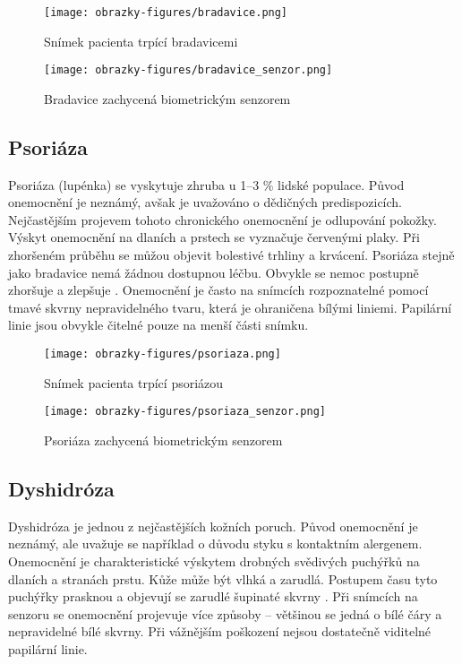 \begin{figure}[!htbp]
  \begin{minipage}[b]{0.5\linewidth}
    \centering
    \texttt{[image: obrazky-figures/bradavice.png]}
    \caption{Snímek pacienta trpící bradavicemi \cite{InfluenceSkinDiseases}}
  \end{minipage}
  \hspace{0.5cm}
  \begin{minipage}[b]{0.5\linewidth}
    \centering
    \texttt{[image: obrazky-figures/bradavice\_senzor.png]}
    \caption{Bradavice zachycená biometrickým senzorem \cite{Barotova}}
  \end{minipage}
\end{figure}

\subsection{Psoriáza}
Psoriáza (lupénka) se vyskytuje zhruba u 1--3 \% lidské populace. Původ onemocnění je neznámý, avšak je uvažováno o dědičných predispozicích. Nejčastějším projevem tohoto chronického onemocnění je odlupování pokožky. Výskyt onemocnění na dlaních a prstech se vyznačuje červenými plaky. Při zhoršeném průběhu se můžou objevit bolestivé trhliny a krvácení. Psoriáza stejně jako bradavice nemá žádnou dostupnou léčbu. Obvykle se nemoc postupně zhoršuje a zlepšuje \cite{Psoriasis,InfluenceSkinDiseases}. Onemocnění je často na snímcích rozpoznatelné pomocí tmavé skvrny nepravidelného tvaru, která je ohraničena bílými liniemi. Papilární linie jsou obvykle čitelné pouze na menší části snímku.

\begin{figure}[!htbp]
  \begin{minipage}[b]{0.5\linewidth}
    \centering
    \texttt{[image: obrazky-figures/psoriaza.png]}
    \caption{Snímek pacienta trpící psoriázou~\cite{InfluenceSkinDiseases}}
  \end{minipage}
  \hspace{0.5cm}
  \begin{minipage}[b]{0.5\linewidth}
    \centering
    \texttt{[image: obrazky-figures/psoriaza\_senzor.png]}
    \caption{Psoriáza zachycená biometrickým senzorem \cite{Barotova}}
  \end{minipage}
\end{figure}
\subsection{Dyshidróza}
Dyshidróza je jednou z nejčastějších kožních poruch. Původ onemocnění je neznámý, ale uvažuje se například o důvodu styku s kontaktním alergenem. Onemocnění je charakteristické výskytem drobných svědivých puchýřků na dlaních a stranách prstu. Kůže může být vlhká a zarudlá. Postupem času tyto puchýřky prasknou a objevují se zarudlé šupinaté skvrny \cite{InfluenceSkinDiseases}. Při snímcích na senzoru se onemocnění projevuje více způsoby -- většinou se jedná o bílé čáry a nepravidelné bílé skvrny. Při vážnějším poškození nejsou dostatečně viditelné papilární linie.

